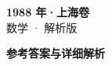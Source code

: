 \documentclass[zihao=-4, a4paper]{ctexart}
\begin{document}
\begin{center}
  {\Large\bfseries 1988 年·上海卷}\\[4pt]
  {\large 数学 · 解析版}
\end{center}
\medskip
{}

\clearpage
{}
\begin{center}{\Large\bfseries 参考答案与详细解析}\end{center}
\medskip

\end{document}
